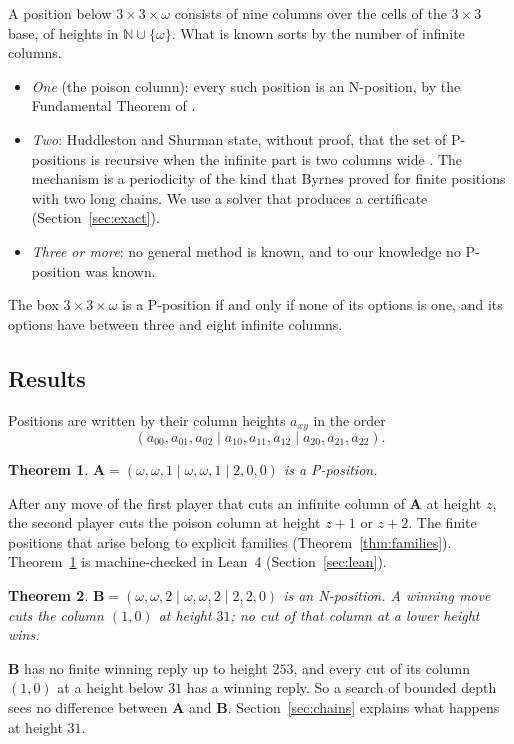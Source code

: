 \documentclass[11pt]{amsart}
\newtheorem{theorem}{Theorem}
\theoremstyle{definition}
\theoremstyle{remark}
\newcommand{\w}{\omega}
\newcommand{\PA}{\mathbf{A}}
\newcommand{\PB}{\mathbf{B}}
\begin{document}
A position below $3\times3\times\omega$ consists of nine columns over the cells of the $3\times3$
base, of heights in $\mathbb N\cup\{\omega\}$. What is known sorts by the number of infinite
columns.
\begin{itemize}
\item \emph{One} (the poison column): every such position is an N-position, by the Fundamental
Theorem of \cite{HS,Gale}.
\item \emph{Two}: Huddleston and Shurman state, without proof, that the set of P-positions
is recursive when the infinite part is two columns wide \cite[p.~211]{HS}. The mechanism is
a periodicity of the kind that Byrnes \cite{By} proved for finite positions with two long
chains. We use a solver that produces a certificate (Section~\ref{sec:exact}).
\item \emph{Three or more}: no general method is known, and to our knowledge no P-position was
known.
\end{itemize}
The box $3\times3\times\omega$ is a P-position if and only if none of its options is one, and
its options have between three and eight infinite columns.

\subsection*{Results}
Positions are written by their column heights $a_{xy}$ in the order
\[
(a_{00},a_{01},a_{02}\mid a_{10},a_{11},a_{12}\mid a_{20},a_{21},a_{22}).
\]

\begin{theorem}\label{thm:A}
$\PA=(\w,\w,1\mid\w,\w,1\mid 2,0,0)$ is a P-position.
\end{theorem}

After any move of the first player that cuts an infinite column of $\PA$ at height $z$, the
second player cuts the poison column at height $z+1$ or $z+2$. The finite positions that arise
belong to explicit families (Theorem~\ref{thm:families}). Theorem~\ref{thm:A} is machine-checked
in Lean~4 (Section~\ref{sec:lean}).

\begin{theorem}\label{thm:B}
$\PB=(\w,\w,2\mid\w,\w,2\mid 2,2,0)$ is an N-position. A winning move cuts the column $(1,0)$ at
height $31$; no cut of that column at a lower height wins.
\end{theorem}

$\PB$ has no finite winning reply up to height $253$, and every cut of its column $(1,0)$ at a
height below $31$ has a winning reply. So a search of bounded depth sees no difference between
$\PA$ and $\PB$. Section~\ref{sec:chains} explains what happens at height $31$.
\end{document}

